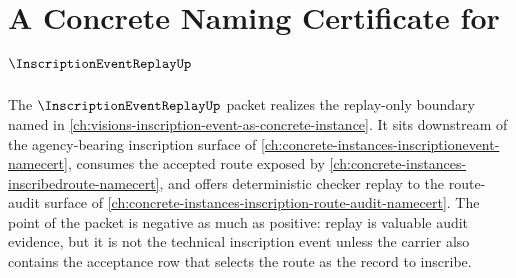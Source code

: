 \chapter{A Concrete Naming Certificate for $\InscriptionEventReplayUp$}
\label{ch:concrete-instances-inscription-event-replay-namecert}

The $\InscriptionEventReplayUp$ packet realizes the replay-only boundary named in \autoref{ch:visions-inscription-event-as-concrete-instance}. It sits downstream of the agency-bearing inscription surface of \autoref{ch:concrete-instances-inscriptionevent-namecert}, consumes the accepted route exposed by \autoref{ch:concrete-instances-inscribedroute-namecert}, and offers deterministic checker replay to the route-audit surface of \autoref{ch:concrete-instances-inscription-route-audit-namecert}. The point of the packet is negative as much as positive: replay is valuable audit evidence, but it is not the technical inscription event unless the carrier also contains the acceptance row that selects the route as the record to inscribe.



